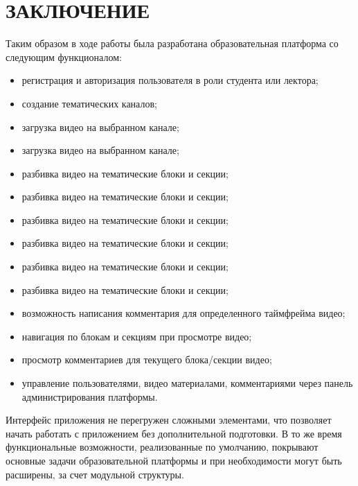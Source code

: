 \section*{ЗАКЛЮЧЕНИЕ}

Таким образом в ходе работы была разработана образовательная платформа со следующим функционалом:
\begin{itemize}
  \item регистрация и авторизация пользователя в роли студента или лектора;
  \item создание тематических каналов;
  \item загрузка видео на выбранном канале;
  \item загрузка видео на выбранном канале;
  \item разбивка видео на тематические блоки и секции;
  \item разбивка видео на тематические блоки и секции;
  \item разбивка видео на тематические блоки и секции;
  \item разбивка видео на тематические блоки и секции;
  \item разбивка видео на тематические блоки и секции;
  \item разбивка видео на тематические блоки и секции;
  \item возможность написания комментария для определенного таймфрейма видео;
  \item навигация по блокам и секциям при просмотре видео;
  \item просмотр комментариев для текущего блока/секции видео;
  \item управление пользователями, видео материалами, комментариями через панель администрирования платформы.
\end{itemize}

Интерфейс приложения не перегружен сложными элементами, что позволяет начать работать с приложением
без дополнительной подготовки. В то же время функциональные возможности, реализованные
по умолчанию, покрывают основные задачи образовательной платформы и при необходимости могут быть
расширены, за счет модульной структуры.